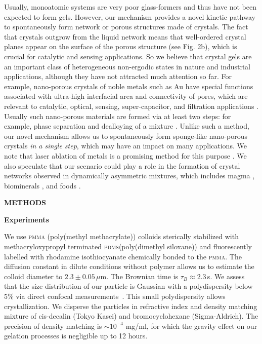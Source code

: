 \documentclass[preprint,amsmath,amssymb,superscriptaddress]{revtex4-1}
\begin{document}
Usually, monoatomic systems are very poor glass-formers and thus have not been expected to form gels. 
However, our mechanism provides a novel kinetic pathway to spontaneously form network or porous structures made of crystals.  The fact that crystals outgrow from the liquid network means that well-ordered crystal planes appear on the surface of the porous structure (see Fig. 2b), which is crucial for catalytic and sensing applications. So we believe that crystal gels are an important class of heterogeneous non-ergodic states in nature 
and industrial applications, although they have not attracted much attention so far.  
For example, nano-porous crystals of noble metals such as Au have special functions associated with ultra-high interfacial area and connectivity of pores, which are relevant to catalytic, optical, sensing, super-capacitor, and filtration applications 
\cite{ding2004nanoporous, ding2009nanoporous, wittstock2010nanoporous,fujita2012atomic}. Usually such nano-porous materials are formed via at least two steps: for example, phase separation and dealloying of a mixture
\cite{erlebacher2001evolution}. Unlike such a method, our novel mechanism allows us to spontaneously form sponge-like nano-porous crystals \emph{in a single step}, 
which may have an impact on many applications. 
We note that laser ablation of metals is a promising method for this purpose \cite{povarnitsyn2013mechanisms}.
We also speculate that our scenario could play a role in the formation of crystal networks observed in dynamically asymmetric mixtures, 
which includes magma \cite{philpotts1998role}, biominerals \cite{rousseau2005multiscale}, and foods \cite{deman1987fat}. 

\vspace{1cm}
\noindent
{\bf METHODS}

\noindent
{\bf Experiments}

We use \textsc{pmma} (poly(methyl methacrylate)) colloids sterically stabilized with methacryloxypropyl terminated \textsc{pdms}(poly(dimethyl siloxane)) and fluorescently labelled with rhodamine isothiocyanate chemically bonded to the \textsc{pmma}.
The diffusion constant in dilute conditions without polymer allows us to estimate the colloid diameter to $2.3\pm 0.05\, \mu$m. The Brownian time is $\tau_B \approx 2.3\,$s. 
We assess that the size distribution of our particle is Gaussian with a polydispersity below 5\% via direct confocal measurements~\cite{Leocmach2013}.
This small polydispersity allows crystallization.
We disperse the particles in refractive index and density matching mixture of cis-decalin (Tokyo Kasei) and bromocyclohexane (Sigma-Aldrich). 
The precision of density matching is $\sim 10^{-4}$ mg/ml, for which the gravity effect on our gelation processes is negligible up to 12 hours.
\end{document}
